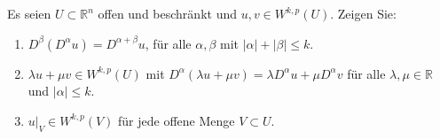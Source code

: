 \begin{exercisePage}
	\begin{task}
		Es seien $U \subset \mathbb R^n$ offen und beschränkt und $u,v \in W^{k,p}(U)$. Zeigen Sie:
		\begin{enumerate}
			\item $D^\beta(D^\alpha u) = D^{\alpha + \beta} u$, für alle $\alpha, \beta$ mit $|\alpha| + |\beta| \leq k$. 
			\item $\lambda u + \mu v \in W^{k,p}(U)$ mit $D^\alpha(\lambda u + \mu v) = \lambda D^\alpha u + \mu D^\alpha v$ für alle $\lambda, \mu \in \mathbb{R}$ und $|\alpha|\leq k$.
			\item $u|_V \in W^{k,p}(V)$ für jede offene Menge $V\subset U$.
		\end{enumerate}	
	\end{task}
\end{exercisePage}